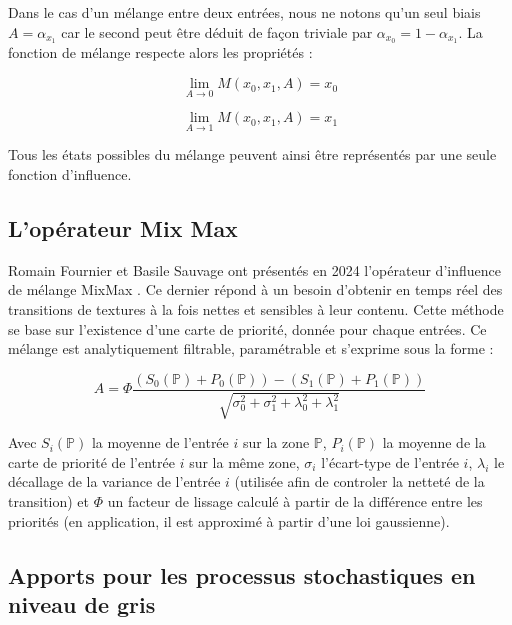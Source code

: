 \documentclass[9pt, twocolumn]{article} %
\begin{document}
Dans le cas d'un mélange entre deux entrées, nous ne notons qu'un seul biais $A
  = \alpha_{x_1}$ car le second peut être déduit de façon triviale par
$\alpha_{x_0} = 1 - \alpha_{x_1}$. La fonction de mélange respecte alors les
propriétés :

\begin{equation}\label{Alpha2WayLim10}
  \lim_{A \rightarrow 0} M(x_0, x_1, A) = x_0
\end{equation}

\begin{equation}\label{Alpha2WayLim1}
  \lim_{A \rightarrow 1} M(x_0, x_1, A) = x_1
\end{equation}

Tous les états possibles du mélange peuvent ainsi être représentés par une
seule fonction d'influence.

\subsection{L'opérateur Mix Max}

Romain Fournier et Basile Sauvage ont présentés en 2024 l'opérateur d'influence
de mélange MixMax \cite{mixmax}. Ce dernier répond à un besoin d'obtenir en
temps réel des transitions de textures à la fois nettes et sensibles à leur
contenu. Cette méthode se base sur l'existence d'une carte de priorité, donnée
pour chaque entrées. Ce mélange est analytiquement filtrable, paramétrable et
s'exprime sous la forme :

\begin{equation}\label{MixMax2024}
  A = \Phi
  \frac{
    (S_0(\mathbb{P}) + P_0(\mathbb{P})) - (S_1(\mathbb{P}) + P_1(\mathbb{P}))
  }{
    \sqrt{\sigma^2_0 + \sigma^2_1 + \lambda^2_0 + \lambda^2_1}
  }
\end{equation}

Avec $S_i(\mathbb{P})$ la moyenne de l'entrée $i$ sur la zone $\mathbb{P}$,
$P_i(\mathbb{P})$ la moyenne de la carte de priorité de l'entrée $i$ sur la
même zone, $\sigma_i$ l'écart-type de l'entrée $i$, $\lambda_i$ le décallage de
la variance de l'entrée $i$ (utilisée afin de controler la netteté de la
transition) et $\Phi$ un facteur de lissage calculé à partir de la différence
entre les priorités (en application, il est approximé à partir d'une loi
gaussienne).

\subsection{Apports pour les processus stochastiques en niveau de gris}
\end{document}

